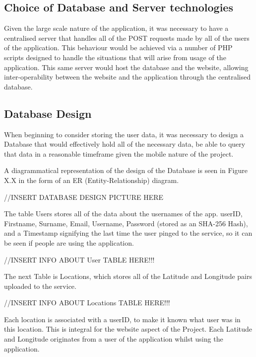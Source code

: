 \documentclass{l4proj}
\begin{document}
\subsection{Choice of Database and Server technologies}

Given the large scale nature of the application, it was necessary to have a centralised server that handles all of the POST requests made by all of the users of the application. This behaviour would be achieved via a number of PHP scripts designed to handle the situations that will arise from usage of the application. This same server would host the database and the website, allowing inter-operability between the website and the application through the centralised database.

\subsection{Database Design}

When beginning to consider storing the user data, it was necessary to design a Database that would effectively hold all of the necessary data, be able to query that data in a reasonable timeframe given the mobile nature of the project.

A diagrammatical representation of the design of the Database is seen in Figure X.X in the form of an ER (Entity-Relationship) diagram.

//INSERT DATABASE DESIGN PICTURE HERE

The table Users stores all of the data about the usernames of the app. userID, Firstname, Surname, Email, Username, Password (stored as an SHA-256 Hash), and a Timestamp signifying the last time the user pinged to the service, so it can be seen if people are using the application.

//INSERT INFO ABOUT User TABLE HERE!!!

The next Table is Locations, which stores all of the Latitude and Longitude pairs uploaded to the service.

//INSERT INFO ABOUT Locations TABLE HERE!!!

Each location is associated with a userID, to make it known what user was in this location. This is integral for the website aspect of the Project. Each Latitude and Longitude originates from a user of the application whilst using the application.
\end{document}
